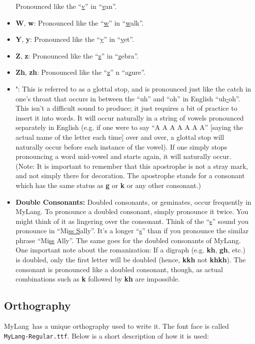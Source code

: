 \documentclass[oneside]{book}
\newcommand{\LanguageName}{MyLang}
\begin{document}
\begin{itemize}
Pronounced like the ``\uline{v}'' in ``\uline{v}an''.
\item
\textbf{W}, \textbf{w}:
Pronounced like the ``\uline{w}'' in ``\uline{w}alk''.
\item
\textbf{Y}, \textbf{y}:
Pronounced like the ``\uline{y}'' in ``\uline{y}et''.
\item
\textbf{Z}, \textbf{z}:
Pronounced like the ``\uline{z}'' in ``\uline{z}ebra''.
\item
\textbf{Zh}, \textbf{zh}:
Pronounced like the ``\uline{z}'' n ``a\uline{z}ure''.
\item
\textbf{'}:
This is referred to as a glottal stop, and is pronounced just like the catch in one's throat that occurs in between the ``uh'' and ``oh'' in English ``uh\uline{-}oh''.
This isn't a difficult sound to produce;
it just requires a bit of practice to insert it into words.
It will occur naturally in a string of vowels pronounced separately in English (e.g. if one were to say ``A A A A A A A'' [saying the actual name of the letter each time] over and over, a glottal stop will naturally occur before each instance of the vowel).
If one simply stops pronouncing a word mid-vowel and starts again, it will naturally occur.
(Note: It is important to remember that this apostrophe is not a stray mark, and not simply there for decoration.
The apostrophe stands for a consonant which has the same status as \textbf{g} or \textbf{k} or any other consonant.)
\item
\textbf{Double Consonants:}
Doubled consonants, or geminates, occur frequently in \LanguageName.
To pronounce a doubled consonant, simply pronounce it twice.
You might think of it as lingering over the consonant.
Think of the ``\uline{s}'' sound you pronounce in ``Mi\uline{ss S}ally''.
It's a longer ``\uline{s}'' than if you pronounce the similar phrase ``Mi\uline{ss} Ally''.
The same goes for the doubled consonants of \LanguageName.
One important note about the romanization:
If a digraph (e.g. \textbf{kh}, \textbf{gh}, etc.) is doubled, only the first letter will be doubled (hence, \textbf{kkh} not \textbf{khkh}).
The consonant is pronounced like a doubled consonant, though, as actual combinations such as \textbf{k} followed by \textbf{kh} are impossible.
\end{itemize}

\subsection{Orthography}

\LanguageName\ has a unique orthography used to write it.
The font face is called \texttt{\LanguageName-Regular.ttf}.
Below is a short description of how it is used:
\end{document}
